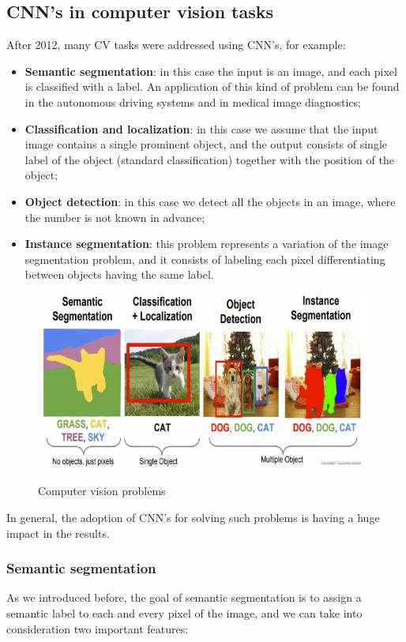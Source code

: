 \subsection{CNN's in computer vision tasks}
After 2012, many CV tasks were addressed using CNN's, for example:

\begin{itemize}
    \item \textbf{Semantic segmentation}: in this case the input is an image, and each pixel is classified with a label. An application of this kind of problem can be found in the autonomous driving systems and in medical image diagnostics;
    \item \textbf{Classification and localization}: in this case we assume that the input image contains a single prominent object, and the output consists of single label of the object (standard classification) together with the position of the object;
    \item \textbf{Object detection}: in this case we detect all the objects in an image, where the number is not known in advance;
    \item \textbf{Instance segmentation}: this problem represents a variation of the image segmentation problem, and it consists of labeling each pixel differentiating between objects having the same label.
\end{itemize}

\begin{figure}[h!]
		\centering
        \includegraphics[scale = 1.5]{img/cv tasks.jpg}
		\label{mi}
        \caption{Computer vision problems}
\end{figure}

In general, the adoption of CNN's for solving such problems is having a huge impact in the results.

\subsubsection{Semantic segmentation}
As we introduced before, the goal of semantic segmentation is to assign a semantic label to each and every pixel of the image, and we can take into consideration two important features:

